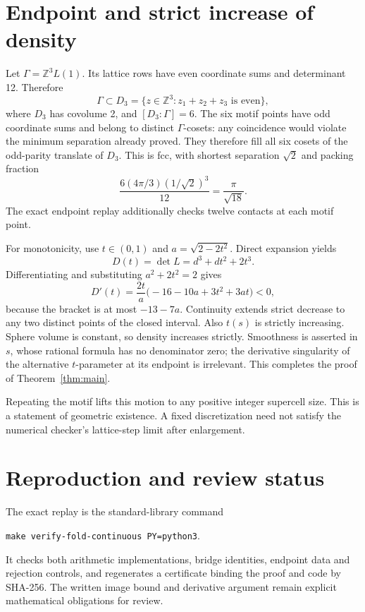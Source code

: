 \documentclass[11pt]{amsart}
\theoremstyle{remark}
\newcommand{\Z}{\mathbb Z}
\begin{document}
\section{Endpoint and strict increase of density}

Let $\Gamma=\Z^3L(1)$. Its lattice rows have even coordinate sums and determinant 12. Therefore
\[
 \Gamma\subset D_3=\{z\in\Z^3:z_1+z_2+z_3\text{ is even}\},
\]
where $D_3$ has covolume 2, and $[D_3:\Gamma]=6$. The six motif points have odd coordinate sums and belong to distinct $\Gamma$-cosets: any coincidence would violate the minimum separation already proved. They therefore fill all six cosets of the odd-parity translate of $D_3$. This is fcc, with shortest separation $\sqrt2$ and packing fraction
\[
 \frac{6(4\pi/3)(1/\sqrt2)^3}{12}=\frac{\pi}{\sqrt{18}}.
\]
The exact endpoint replay additionally checks twelve contacts at each motif point.

For monotonicity, use $t\in(0,1)$ and $a=\sqrt{2-2t^2}$. Direct expansion yields
\[
 D(t)=\det L=d^3+dt^2+2t^3.
\]
Differentiating and substituting $a^2+2t^2=2$ gives
\[
 D'(t)=\frac{2t}{a}\bigl(-16-10a+3t^2+3at\bigr)<0,
\]
because the bracket is at most $-13-7a$. Continuity extends strict decrease to any two distinct points of the closed interval. Also $t(s)$ is strictly increasing. Sphere volume is constant, so density increases strictly. Smoothness is asserted in $s$, whose rational formula has no denominator zero; the derivative singularity of the alternative $t$-parameter at its endpoint is irrelevant. This completes the proof of Theorem~\ref{thm:main}.

Repeating the motif lifts this motion to any positive integer supercell size. This is a statement of geometric existence. A fixed discretization need not satisfy the numerical checker's lattice-step limit after enlargement.

\section{Reproduction and review status}

The exact replay is the standard-library command
\begin{center}\texttt{make verify-fold-continuous PY=python3}.\end{center}
It checks both arithmetic implementations, bridge identities, endpoint data and rejection controls, and regenerates a certificate binding the proof and code by SHA-256. The written image bound and derivative argument remain explicit mathematical obligations for review.
\end{document}
